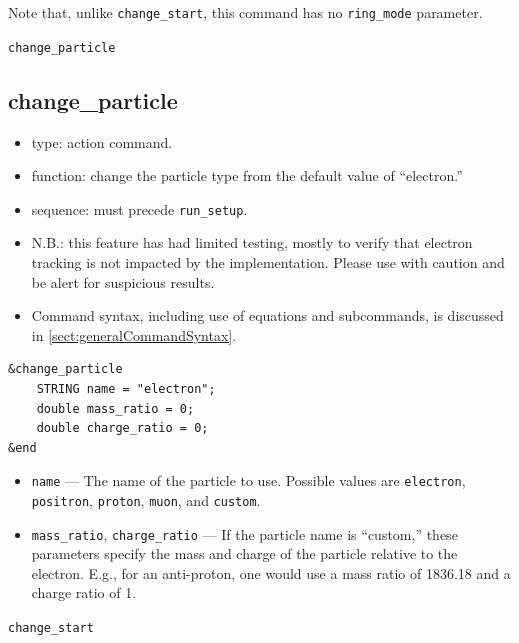 \documentclass[11pt]{article}
\begin{document}
Note that, unlike \verb|change_start|, this command has no \verb|ring_mode| parameter.

\newpage
\begin{center}{\Large\verb|change_particle|}\end{center}
\subsection{change\_particle\label{subsec:changeparticle}}

\begin{itemize}
\item type: action command.
\item function: change the particle type from the default value of ``electron.''
\item sequence: must precede \verb|run_setup|.
\item N.B.: this feature has had limited testing, mostly to verify that electron tracking is not
 impacted by the implementation.  Please use with caution and be alert for suspicious results.
\item Command syntax, including use of equations and subcommands, is discussed in \ref{sect:generalCommandSyntax}.
\end{itemize}

\begin{verbatim}
&change_particle
    STRING name = "electron";
    double mass_ratio = 0;
    double charge_ratio = 0;
&end
\end{verbatim}

\begin{itemize}
\item \verb|name| --- The name of the particle to use.  Possible values are \verb|electron|, \verb|positron|,
  \verb|proton|, \verb|muon|, and \verb|custom|.
\item \verb|mass_ratio|, \verb|charge_ratio| --- If the particle name is ``custom,'' these parameters specify the
  mass and charge of the particle relative to the electron.  E.g., for an anti-proton, one would use
  a mass ratio of 1836.18 and a charge ratio of 1.
\end{itemize}

\newpage
\begin{center}{\Large\verb|change_start|}\end{center}
\end{document}
